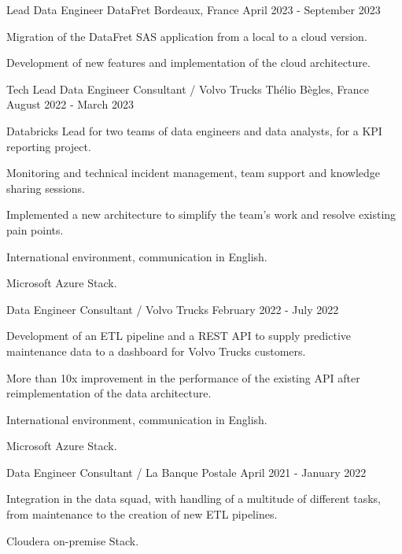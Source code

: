 
\begin{cventries}
	\cventry
	{Lead Data Engineer}
	{DataFret}
	{Bordeaux, France}
	{April 2023 - September 2023}
	{
		\begin{cvitems}
			\item {Migration of the DataFret SAS application from a local to a cloud version.}
			\item {Development of new features and implementation of the cloud architecture.}
		\end{cvitems}
	}
	
	\cventry
	{Tech Lead Data Engineer Consultant / Volvo Trucks}
	{Thélio}
	{Bègles, France}
	{August 2022 - March 2023}
	{
		\begin{cvitems}
			\item Databricks Lead for two teams of data engineers and data analysts, for a KPI reporting project.
			\item Monitoring and technical incident management, team support and knowledge sharing sessions.
			\item Implemented a new architecture to simplify the team's work and resolve existing pain points.
			\item International environment, communication in English.
			\item Microsoft Azure Stack.
		\end{cvitems}
	}
	
	\cventry
	{Data Engineer Consultant / Volvo Trucks}{}{}
	{February 2022 - July 2022}
	{
		\begin{cvitems}
			\item Development of an ETL pipeline and a REST API to supply predictive maintenance data to a dashboard for Volvo Trucks customers.
			\item More than 10x improvement in the performance of the existing API after reimplementation of the data architecture.
			\item International environment, communication in English.
			\item Microsoft Azure Stack.
		\end{cvitems}
	}
	
	\cventry
	{Data Engineer Consultant / La Banque Postale}{}{}
	{April 2021 - January 2022}
	{
		\begin{cvitems}
			\item Integration in the data squad, with handling of a multitude of different tasks, from maintenance to the creation of new ETL pipelines.
			\item Cloudera on-premise Stack.
		\end{cvitems}
	}
	

\end{cventries}
